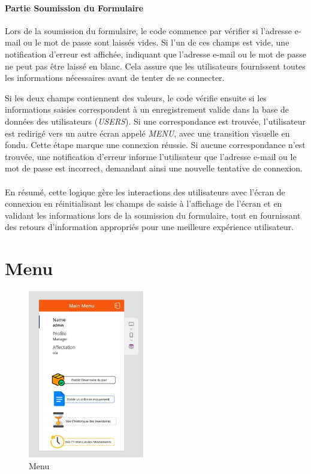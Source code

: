 \documentclass[a4paper, oneside, 12pt, final]{extreport}
\begin{document}
\paragraph{Partie Soumission du Formulaire}
Lors de la soumission du formulaire, le code commence par vérifier si l'adresse e-mail ou le mot de passe sont laissés vides. Si l'un de ces champs est vide, une notification d'erreur est affichée, indiquant que l'adresse e-mail ou le mot de passe ne peut pas être laissé en blanc. Cela assure que les utilisateurs fournissent toutes les informations nécessaires avant de tenter de se connecter.

Si les deux champs contiennent des valeurs, le code vérifie ensuite si les informations saisies correspondent à un enregistrement valide dans la base de données des utilisateurs (\textit{USERS}). Si une correspondance est trouvée, l'utilisateur est redirigé vers un autre écran appelé \textit{MENU}, avec une transition visuelle en fondu. Cette étape marque une connexion réussie. Si aucune correspondance n'est trouvée, une notification d'erreur informe l'utilisateur que l'adresse e-mail ou le mot de passe est incorrect, demandant ainsi une nouvelle tentative de connexion.
\\
\\
En résumé, cette logique gère les interactions des utilisateurs avec l'écran de connexion en réinitialisant les champs de saisie à l'affichage de l'écran et en validant les informations lors de la soumission du formulaire, tout en fournissant des retours d'information appropriés pour une meilleure expérience utilisateur.

\newpage
\section{Menu}
\begin{figure}[h]
    \centering
    \includegraphics[width=0.45\textwidth]{menu.jpg} %
    \caption{Menu}
    \label{fig:Menu}
\end{figure}
\end{document}

